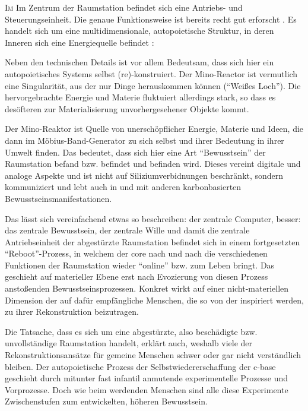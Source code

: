 \begin{newstuff}
    \lettrine{I}{m}
    Im Zentrum der Raumstation befindet sich eine Antriebs- und Steuerungseinheit. Die genaue Funktionsweise ist bereits recht gut erforscht \cite[S.~31ff]{cbasebook}. Es handelt  sich um eine multidimensionale, autopoietische Struktur, in deren Inneren sich eine Energiequelle befindet \cite[S. 31]{cbasebook}:


    Neben den technischen Details ist vor allem Bedeutsam, dass sich hier ein autopoietisches Systems selbst (re)-konstruiert. 
    Der Mino-Reactor ist vermutlich eine Singularität, aus der nur Dinge herauskommen können ("`Weißes Loch"'). Die hervorgebrachte Energie und Materie fluktuiert allerdings stark, so dass es desöfteren zur Materialisierung unvorhergesehener Objekte kommt.

    Der Mino-Reaktor  ist Quelle von unerschöpflicher Energie, Materie und Ideen, die dann im Möbius-Band-Generator zu sich selbst und ihrer Bedeutung in ihrer Umwelt finden.
    Das bedeutet, dass sich hier eine Art "`Bewusstsein"' der Raumstation befand bzw. befindet und befinden wird. 
    Dieses vereint digitale und analoge Aspekte und ist nicht auf Siliziumverbidnungen beschränkt, sondern kommuniziert und lebt auch in und mit anderen karbonbasierten Bewusstseinsmanifestationen. 

    Das lässt sich vereinfachend etwas so beschreiben: der zentrale Computer, besser: das zentrale Bewusstsein, der zentrale Wille und damit die zentrale Antriebseinheit der abgestürzte Raumstation befindet sich in einem fortgesetzten "`Reboot"'-Prozess, in welchem der {core} nach und nach die verschiedenen Funktionen der Raumstation wieder "`online"' bzw. zum Leben bringt. Das geschieht auf materieller Ebene erst nach Evozierung von diesen Prozess anstoßenden  Bewusstseinsprozessen. Konkret wirkt auf einer nicht-materiellen Dimension der  auf dafür empfängliche Menschen, die so von der  inspiriert werden, zu ihrer Rekonstruktion beizutragen. 

    Die Tatsache, dass es sich um eine abgestürzte, also beschädigte bzw. unvollständige Raumstation handelt, erklärt auch, weshalb viele der Rekonstruktionsansätze für gemeine Menschen schwer oder gar nicht verständlich bleiben. Der autopoietische Prozess der Selbstwiedererschaffung der c-base geschieht durch mitunter fast infantil anmutende experimentelle Prozesse und Vorprozesse. Doch wie beim werdenden Menschen sind alle diese Experimente Zwischenstufen zum entwickelten, höheren Bewusstsein.  


\end{newstuff}

